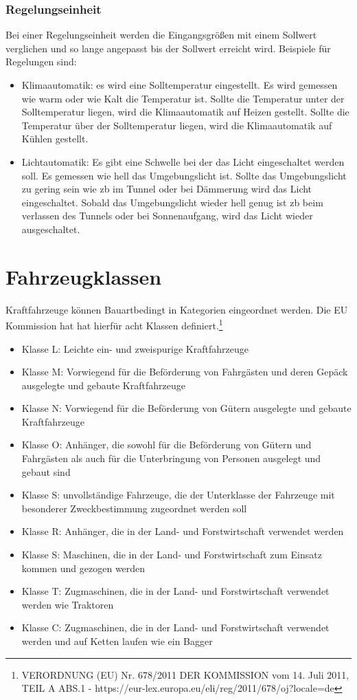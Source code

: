 \subsubsection{Regelungseinheit}
Bei einer Regelungseinheit werden die Eingangsgrößen mit einem Sollwert verglichen und so lange angepasst bis der Sollwert erreicht wird.
Beispiele für Regelungen sind:
\begin{itemize}
	\item Klimaautomatik: es wird eine Solltemperatur eingestellt.
	      Es wird gemessen wie warm oder wie Kalt die Temperatur ist.
	      Sollte die Temperatur unter der Solltemperatur liegen, wird die Klimaautomatik auf Heizen gestellt.
	      Sollte die Temperatur über der Solltemperatur liegen, wird die Klimaautomatik auf Kühlen gestellt.
	\item Lichtautomatik: Es gibt eine Schwelle bei der das Licht eingeschaltet werden soll.
	      Es gemessen wie hell das Umgebungslicht ist. 
	      Sollte das Umgebungslicht zu gering sein wie \ac*{zb} im Tunnel oder bei Dämmerung wird das Licht eingeschaltet. 
	      Sobald das Umgebungslicht wieder hell genug ist \ac*{zb} beim verlassen des Tunnels oder bei Sonnenaufgang, wird das Licht wieder ausgeschaltet.
\end{itemize}


\section{Fahrzeugklassen}

Kraftfahrzeuge können Bauartbedingt in Kategorien eingeordnet werden.
Die EU Kommission hat hat hierfür acht Klassen definiert.\footnote{VERORDNUNG (EU) Nr. 678/2011 DER KOMMISSION
	vom 14. Juli 2011, TEIL A ABS.1 - https://eur-lex.europa.eu/eli/reg/2011/678/oj?locale=de}

\begin{itemize}
	\item Klasse L: Leichte ein- und zweispurige Kraftfahrzeuge
	\item Klasse M: Vorwiegend für die Beförderung von Fahrgästen und deren Gepäck ausgelegte und gebaute Kraftfahrzeuge
	\item Klasse N: Vorwiegend für die Beförderung von Gütern ausgelegte und gebaute Kraftfahrzeuge
	\item Klasse O: Anhänger, die sowohl für die Beförderung von Gütern und Fahrgästen als auch für die Unterbringung von Personen ausgelegt und gebaut sind
	\item Klasse S: unvollständige Fahrzeuge, die der Unterklasse der Fahrzeuge mit besonderer Zweckbestimmung zugeordnet werden soll
	\item Klasse R: Anhänger, die in der Land- und Forstwirtschaft verwendet werden
	\item Klasse S: Maschinen, die in der Land- und Forstwirtschaft zum Einsatz kommen und gezogen werden
	\item Klasse T: Zugmaschinen, die in der Land- und Forstwirtschaft verwendet werden wie Traktoren
	\item Klasse C: Zugmaschinen, die in der Land- und Forstwirtschaft verwendet werden und auf Ketten laufen wie ein Bagger
\end{itemize}

